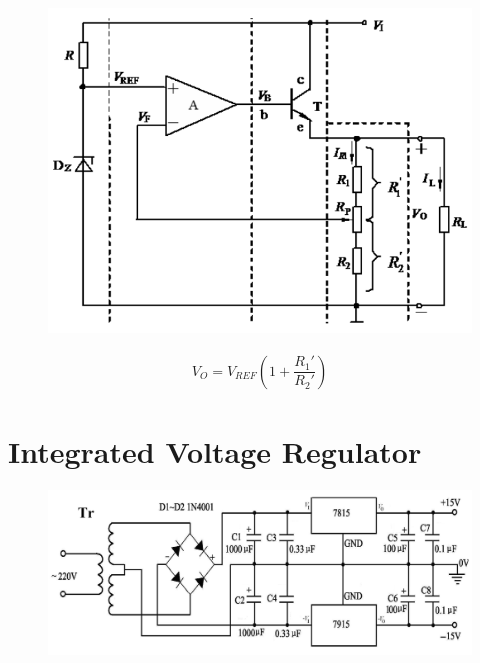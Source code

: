 \begin{figure}[H]
  \centering
  \includegraphics[width=\linewidth]{figures/Series-Feedback-Voltage-Regulator}
\end{figure}

\begin{equation*}
  \begin{aligned}
    V_O = V_{REF} \left( 1 + \dfrac{R_1'}{R_2'}  \right)
  \end{aligned}
\end{equation*}

\section{Integrated Voltage Regulator}

\begin{figure}[H]
  \centering
  \includegraphics[width=\linewidth]{figures/Integrated-Voltage-Regulator}
\end{figure}

